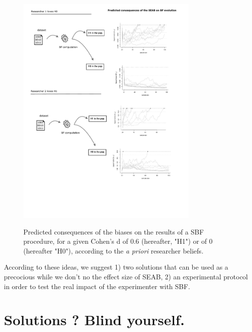\documentclass[a4paper,man,natbib,floatsintext,donotrepeattitle]{apa6}
\begin{document}
\begin{figure}[H]
  \caption{Predicted consequences of the biases on the results of a SBF procedure, for a given Cohen's d of 0.6 (hereafter, "H1") or of 0 (hereafter "H0"), according to the \emph{a priori} researcher beliefs.}
  \centering
  \includegraphics[width=0.8\textwidth]{figures/BFF_predictions.pdf}
  \label{fig:pred}
\end{figure}



According to these ideas, we suggest 1) two solutions that can be used as a precocious while we don't no the effect size of SEAB, 2) an experimental protocol in order to test the real impact of the experimenter with SBF. 

\section{Solutions ? Blind yourself.}
\end{document}
